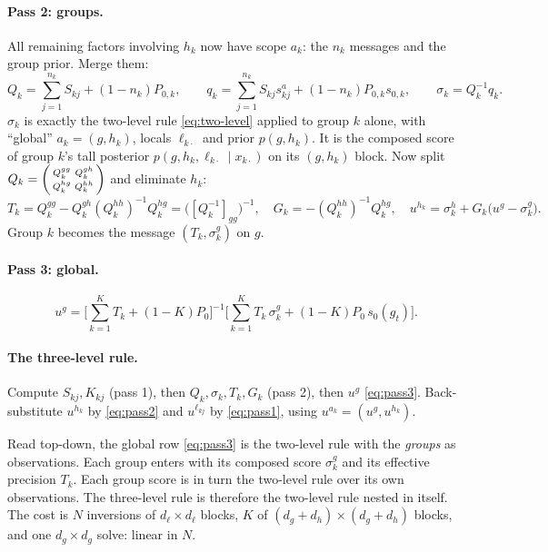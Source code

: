 \documentclass[11pt]{article}
\theoremstyle{definition}
\theoremstyle{remark}
\begin{document}
\paragraph{Pass 2: groups.} All remaining factors involving $h_k$ now have scope
$a_k$: the $n_k$ messages and the group prior. Merge them:
\begin{equation}\label{eq:pass2-merge}
Q_k=\sum_{j=1}^{n_k}S_{kj}+(1-n_k)P_{0,k},\qquad
q_k=\sum_{j=1}^{n_k}S_{kj}s^a_{kj}+(1-n_k)P_{0,k}s_{0,k},\qquad
\sigma_k=Q_k^{-1}q_k.
\end{equation}
$\sigma_k$ is exactly the two-level rule \eqref{eq:two-level} applied to group $k$
alone, with ``global'' $a_k=(g,h_k)$, locals $\ell_{k\cdot}$ and prior $p(g,h_k)$.
It is the composed score of group $k$'s tall posterior
$p(g,h_k,\ell_{k\cdot}\mid x_{k\cdot})$ on its $(g,h_k)$ block. Now split
$Q_k=\begin{psmallmatrix}Q_k^{gg}&Q_k^{gh}\\Q_k^{hg}&Q_k^{hh}\end{psmallmatrix}$ and eliminate $h_k$:
\begin{equation}\label{eq:pass2}
T_k=Q_k^{gg}-Q_k^{gh}(Q_k^{hh})^{-1}Q_k^{hg}=\big([Q_k^{-1}]_{gg}\big)^{-1},\quad
G_k=-(Q_k^{hh})^{-1}Q_k^{hg},\quad
u^{h_k}=\sigma^h_k+G_k\big(u^g-\sigma^g_k\big).
\end{equation}
Group $k$ becomes the message $(T_k,\sigma_k^g)$ on $g$.

\paragraph{Pass 3: global.}
\begin{equation}\label{eq:pass3}
u^g=\Big[\sum_{k=1}^{K}T_k+(1-K)P_0\Big]^{-1}\Big[\sum_{k=1}^{K}T_k\,\sigma^g_k+(1-K)P_0\,s_0(g_t)\Big].
\end{equation}

\paragraph{The three-level rule.} Compute $S_{kj},K_{kj}$ (pass 1), then
$Q_k,\sigma_k,T_k,G_k$ (pass 2), then $u^g$ \eqref{eq:pass3}. Back-substitute
$u^{h_k}$ by \eqref{eq:pass2} and $u^{\ell_{kj}}$ by \eqref{eq:pass1}, using
$u^{a_k}=(u^g,u^{h_k})$.

Read top-down, the global row \eqref{eq:pass3} is the two-level rule with the
\emph{groups} as observations. Each group enters with its composed score
$\sigma^g_k$ and its effective precision $T_k$. Each group score is in turn the
two-level rule over its own observations. The three-level rule is therefore the
two-level rule nested in itself. The cost is $N$ inversions of $d_\ell\times d_\ell$
blocks, $K$ of $(d_g+d_h)\times(d_g+d_h)$ blocks, and one $d_g\times d_g$ solve:
linear in $N$.
\end{document}
